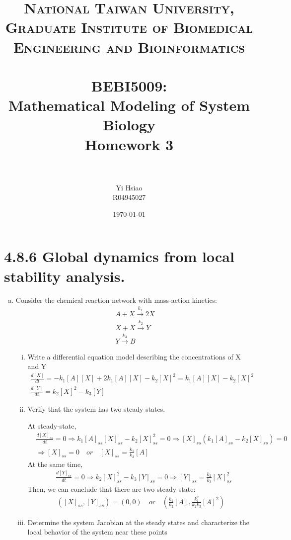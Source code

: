 \documentclass[paper=a4, fontsize=11pt]{scrartcl} %
\title{	
\normalfont \normalsize 
\textsc{National Taiwan University, \\ Graduate Institute of Biomedical Engineering and Bioinformatics} \\ [25pt] %
\horrule{0.5pt} \\[0.4cm] %
\huge BEBI5009:\\Mathematical Modeling of System Biology \\ Homework 3 \\ %
\horrule{2pt} \\[0.5cm] %
}
\author{Yi Hsiao\\R04945027} %
\date{\normalsize\today} %
\numberwithin{equation}{section} %
\numberwithin{figure}{section} %
\numberwithin{table}{section} %
\begin{document}
\maketitle %

\newpage
\section{4.8.6 Global dynamics from local stability analysis.}
	\begin{enumerate}[a)]
		\item Consider the chemical reaction network with mass-action kinetics:
		\begin{gather*}
			A + X \xrightarrow{k_1} 2X \\
			X + X \xrightarrow{k_2} Y \\
			Y \xrightarrow{k_3} B
		\end{gather*}
		\begin{enumerate}[i)]
			\item Write a differential equation model describing the concentrations of X and Y
			\begin{gather*}
				\frac{d[X]}{dt} = -k_1[A][X]+2k_1[A][X]-k_2[X]^2=k_1[A][X]-k_2[X]^2\\
				\frac{d[Y]}{dt} = k_2[X]^2-k_3[Y]
			\end{gather*}

			\item Verify that the system has two steady states.

			At steady-state,
			\begin{align*}
				&\frac{d[X]_{ss}}{dt}=0 \Rightarrow k_1[A]_{ss}[X]_{ss}-k_2[X]^2_{ss}=0 \Rightarrow [X]_{ss}(k_1[A]_{ss}-k_2[X]_{ss})=0 \\
				&\Rightarrow [X]_{ss}=0 \quad or \quad [X]_{ss}=\frac{k_1}{k_2}[A]
			\end{align*}
			At the same time,
			\begin{align*}
				&\frac{d[Y]_{ss}}{dt}=0 \Rightarrow k_2[X]^2_{ss}-k_3[Y]_{ss}=0 \Rightarrow [Y]_{ss}=\frac{k_2}{k_3}[X]^2_{ss}
			\end{align*}
			Then, we can conclude that there are two steady-state:
			\begin{align*}
				([X]_{ss},[Y]_{ss})=(0,0) \quad or \quad (\frac{k_1}{k_2}[A],\frac{k^2_1}{k_2k_3}[A]^2)
			\end{align*}
			\item Determine the system Jacobian at the steady states and characterize the local behavior of the system near these points


\end{enumerate}
\end{enumerate}
\end{document}
